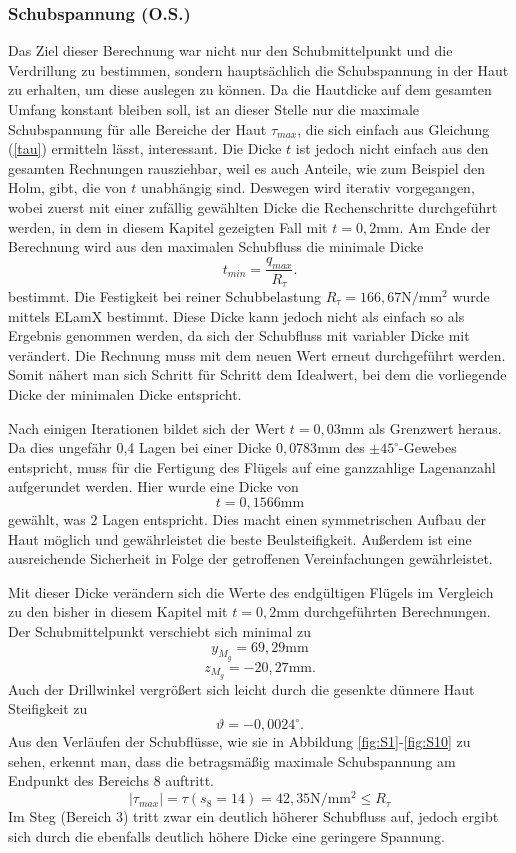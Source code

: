 \subsubsection{Schubspannung (O.S.)}
Das Ziel dieser Berechnung war nicht nur den Schubmittelpunkt und die Verdrillung zu bestimmen, sondern hauptsächlich die Schubspannung in der Haut zu erhalten, um diese auslegen zu können. Da die Hautdicke auf dem gesamten Umfang konstant bleiben soll, ist an dieser Stelle nur die maximale Schubspannung für alle Bereiche der Haut $\tau_{max}$, die sich einfach aus Gleichung (\ref{tau}) ermitteln lässt, interessant. Die Dicke $t$ ist jedoch nicht einfach aus den gesamten Rechnungen rausziehbar, weil es auch Anteile, wie zum Beispiel den Holm, gibt, die von $t$ unabhängig sind. Deswegen wird iterativ vorgegangen, wobei zuerst mit einer zufällig gewählten Dicke die Rechenschritte durchgeführt werden, in dem in diesem Kapitel gezeigten Fall mit $t=0,2\mathrm{mm}$. Am Ende der Berechnung wird aus den maximalen Schubfluss die minimale Dicke
\begin{equation}
	t_{min} = \frac{q_{max}}{R_{\tau}}.
\end{equation} 
bestimmt. Die Festigkeit bei reiner Schubbelastung $R_{\tau} = 166,67\mathrm{N/mm^2}$ wurde mittels ELamX bestimmt. Diese Dicke kann jedoch nicht als einfach so als Ergebnis genommen werden, da sich der Schubfluss mit variabler Dicke mit verändert. Die Rechnung muss mit dem neuen Wert erneut durchgeführt werden. Somit nähert man sich Schritt für Schritt dem Idealwert, bei dem die vorliegende Dicke der minimalen Dicke entspricht.

Nach einigen Iterationen bildet sich der Wert $t = 0,03\mathrm{mm}$ als Grenzwert heraus. Da dies ungefähr 0,4 Lagen bei einer Dicke $0,0783\mathrm{mm}$ des $\pm45^\circ$-Gewebes entspricht, muss für die Fertigung des Flügels auf eine ganzzahlige Lagenanzahl aufgerundet werden. Hier wurde eine Dicke von 
\begin{equation}
	t = 0,1566 \mathrm{mm}
\end{equation}
gewählt, was $2$ Lagen entspricht. Dies macht einen symmetrischen Aufbau der Haut möglich und gewährleistet die beste Beulsteifigkeit. Außerdem ist eine ausreichende Sicherheit in Folge der getroffenen Vereinfachungen gewährleistet.

Mit dieser Dicke verändern sich die Werte des endgültigen Flügels im Vergleich zu den bisher in diesem Kapitel mit $t=0,2\mathrm{mm}$ durchgeführten Berechnungen. Der Schubmittelpunkt verschiebt sich minimal zu
$$
	y_{M_{g}}=69,29\mathrm{mm}
$$
$$
	z_{M_{g}}=-20,27\mathrm{mm}.
$$
Auch der Drillwinkel vergrößert sich leicht durch die gesenkte dünnere Haut Steifigkeit zu
$$
	\vartheta =-0,0024 ^\circ.
$$
Aus den Verläufen der Schubflüsse, wie sie in Abbildung \ref{fig:S1}-\ref{fig:S10} zu sehen, erkennt man, dass die betragsmäßig maximale Schubspannung am Endpunkt des Bereichs 8 auftritt.
$$
	|\tau_{max}|=\tau(s_8=14)=42,35\mathrm{N/mm^2}\leq R_{\tau}
$$
Im Steg (Bereich 3) tritt zwar ein deutlich höherer Schubfluss auf, jedoch ergibt sich durch die ebenfalls deutlich höhere Dicke eine geringere Spannung.







